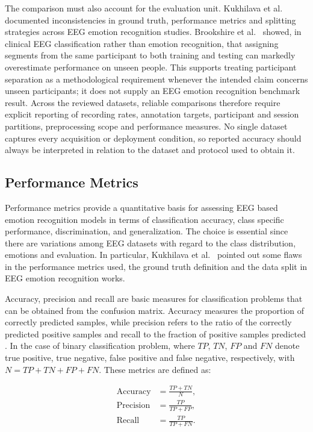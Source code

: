 \documentclass[ASNA,twocolumn]{USG}
\begin{document}
The comparison must also account for the evaluation unit. Kukhilava et al.~\cite{kukhilava2025evaluation} documented inconsistencies in ground truth, performance metrics and splitting strategies across EEG emotion recognition studies. Brookshire et al.~\cite{brookshire2024data} showed, in clinical EEG classification rather than emotion recognition, that assigning segments from the same participant to both training and testing can markedly overestimate performance on unseen people. This supports treating participant separation as a methodological requirement whenever the intended claim concerns unseen participants; it does not supply an EEG emotion recognition benchmark result. Across the reviewed datasets, reliable comparisons therefore require explicit reporting of recording rates, annotation targets, participant and session partitions, preprocessing scope and performance measures. No single dataset captures every acquisition or deployment condition, so reported accuracy should always be interpreted in relation to the dataset and protocol used to obtain it.


\subsection{Performance Metrics}
\label{subsec:performance_metrics}

Performance metrics provide a quantitative basis for assessing EEG based emotion recognition models in terms of classification accuracy, class specific performance, discrimination, and generalization. The choice is essential since there are variations among EEG datasets with regard to the class distribution, emotions and evaluation. In particular, Kukhilava et al.~\cite{kukhilava2025evaluation} pointed out some flaws in the performance metrics used, the ground truth definition and the data split in EEG emotion recognition works. 

Accuracy, precision and recall are basic measures for classification problems that can be obtained from the confusion matrix. Accuracy measures the proportion of correctly predicted samples, while precision refers to the ratio of the correctly predicted positive samples and recall to the fraction of positive samples predicted \cite{geng2025deep}. In the case of binary classification problem, where $TP$, $TN$, $FP$ and $FN$ denote true positive, true negative, false positive and false negative, respectively, with $N=TP+TN+FP+FN$. These metrics are defined as:

\begin{equation}
\begin{aligned}
\mathrm{Accuracy} &= \frac{TP+TN}{N},\\[3pt]
\mathrm{Precision} &= \frac{TP}{TP+FP},\\[3pt]
\mathrm{Recall} &= \frac{TP}{TP+FN}.
\end{aligned}
\label{eq:basic_metrics}
\end{equation}
\end{document}
